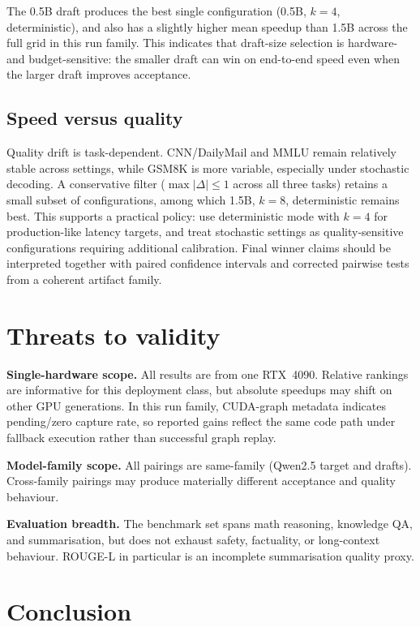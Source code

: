 The 0.5B draft produces the best single configuration
(0.5B, $k{=}4$, deterministic), and also has a slightly higher mean speedup
than 1.5B across the full grid in this run family. This indicates that
draft-size selection is hardware- and budget-sensitive: the smaller draft can
win on end-to-end speed even when the larger draft improves acceptance.

\subsection{Speed versus quality}

Quality drift is task-dependent. CNN/DailyMail and MMLU remain relatively
stable across settings, while GSM8K is more variable, especially under
stochastic decoding. A conservative filter
($\max |\Delta| \le 1$ across all three tasks) retains a small subset of
configurations, among which 1.5B, $k{=}8$, deterministic remains best.
This supports a practical policy: use deterministic mode with $k{=}4$ for
production-like latency targets, and treat stochastic settings as
quality-sensitive configurations requiring additional calibration.
Final winner claims should be interpreted together with paired confidence
intervals and corrected pairwise tests from a coherent artifact family.

\section{Threats to validity}
\label{sec:threats}

\textbf{Single-hardware scope.}
All results are from one RTX~4090. Relative rankings are informative for this
deployment class, but absolute speedups may shift on other GPU generations.
In this run family, CUDA-graph metadata indicates pending/zero capture rate,
so reported gains reflect the same code path under fallback execution rather
than successful graph replay.

\textbf{Model-family scope.}
All pairings are same-family (Qwen2.5 target and drafts). Cross-family
pairings may produce materially different acceptance and quality behaviour.

\textbf{Evaluation breadth.}
The benchmark set spans math reasoning, knowledge QA, and summarisation, but
does not exhaust safety, factuality, or long-context behaviour. ROUGE-L in
particular is an incomplete summarisation quality proxy.

\section{Conclusion}
\label{sec:conclusion}

